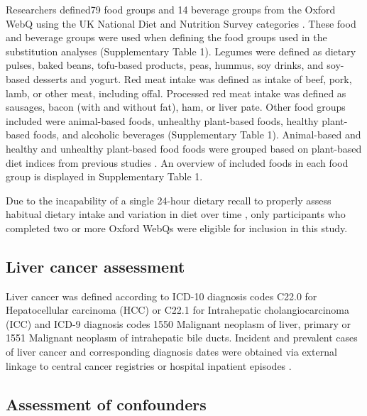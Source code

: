 \documentclass[sn-basic,Numbered,iicol,pdflatex]{sn-jnl}
\begin{document}
Researchers defined79 food groups and 14 beverage groups from the Oxford
WebQ using the UK National Diet and Nutrition Survey categories
\citep{piernas2021}. These food and beverage groups were used when defining
the food groups used in the substitution analyses (Supplementary Table
1). Legumes were defined as dietary pulses, baked beans, tofu-based
products, peas, hummus, soy drinks, and soy-based desserts and yogurt.
Red meat intake was defined as intake of beef, pork, lamb, or other
meat, including offal. Processed red meat intake was defined as
sausages, bacon (with and without fat), ham, or liver pate. Other food
groups included were animal-based foods, unhealthy plant-based foods,
healthy plant-based foods, and alcoholic beverages (Supplementary Table
1). Animal-based and healthy and unhealthy plant-based food foods were
grouped based on plant-based diet indices from previous studies
\citep{Thompson2023, Heianza2021, Satija2017, Satija2016}. An overview of
included foods in each food group is displayed in Supplementary Table 1.

Due to the incapability of a single 24-hour dietary recall to properly
assess habitual dietary intake and variation in diet over time
\citep{thompson2013, gurinovic2017}, only participants who completed two or
more Oxford WebQs were eligible for inclusion in this study.

\hypertarget{subsec3}{%
\subsection{Liver cancer assessment}\label{subsec3}}

Liver cancer was defined according to ICD-10 diagnosis codes C22.0 for
Hepatocellular carcinoma (HCC) or C22.1 for Intrahepatic
cholangiocarcinoma (ICC) and ICD-9 diagnosis codes 1550 Malignant
neoplasm of liver, primary or 1551 Malignant neoplasm of intrahepatic
bile ducts. Incident and prevalent cases of liver cancer and
corresponding diagnosis dates were obtained via external linkage to
central cancer registries or hospital inpatient episodes \citep{RN112, RN114}.

\hypertarget{subsec4}{%
\subsection{Assessment of confounders}\label{subsec4}}
\end{document}

